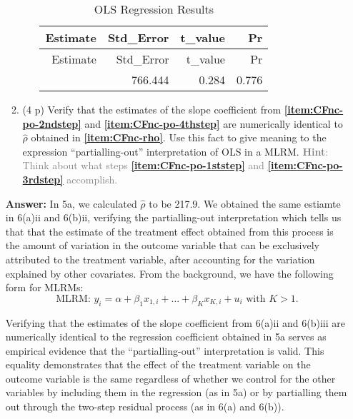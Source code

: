 \documentclass[
]{article}
\begin{document}
\begin{enumerate}
\begin{enumerate}
\begin{enumerate}
      \begin{longtable}[]{@{}rrrr@{}}
      \caption{OLS Regression Results}\tabularnewline
      \toprule\noalign{}
      Estimate & Std\_Error & t\_value & Pr \\
      \midrule\noalign{}
      \endfirsthead
      \toprule\noalign{}
      Estimate & Std\_Error & t\_value & Pr \\
      \midrule\noalign{}
      \endhead
      \bottomrule\noalign{}
      \endlastfoot
      217.944 & 766.444 & 0.284 & 0.776 \\
      \end{longtable}
    \end{enumerate}
  \item
    (4 p) Verify that the estimates of the slope coefficient from
    \textbf{\ref{item:CFnc-po-2ndstep}} and
    \textbf{\ref{item:CFnc-po-4thstep}} are numerically identical to
    \(\hat{\rho}\) obtained in \textbf{\ref{item:CFnc-rho}}. Use this
    fact to give meaning to the expression ``partialling-out''
    interpretation of OLS in a MLRM.
    \textcolor{gray}{\textbf{Hint}: Think about what steps \textbf{\ref{item:CFnc-po-1ststep}} and \textbf{\ref{item:CFnc-po-3rdstep}} accomplish.}
  \end{enumerate}

  \textbf{Answer:} In 5a, we calculated \(\hat{\rho}\) to be 217.9. We
  obtained the same estiamte in 6(a)ii and 6(b)ii, verifying the
  partialling-out interpretation which tells us that that the estimate
  of the treatment effect obtained from this process is the amount of
  variation in the outcome variable that can be exclusively attributed
  to the treatment variable, after accounting for the variation
  explained by other covariates. From the background, we have the
  following form for MLRMs: \newline
  \[\text{MLRM: }y_i=\alpha+\beta_1 x_{1,i} + \dots + \beta_K x_{K,i} +u_i \text{ with } K>1.\]

  Verifying that the estimates of the slope coefficient from 6(a)ii and
  6(b)iii are numerically identical to the regression coefficient
  obtained in 5a serves as empirical evidence that the
  ``partialling-out'' interpretation is valid. This equality
  demonstrates that the effect of the treatment variable on the outcome
  variable is the same regardless of whether we control for the other
  variables by including them in the regression (as in 5a) or by
  partialling them out through the two-step residual process (as in 6(a)
  and 6(b)).
\end{enumerate}
\end{document}
